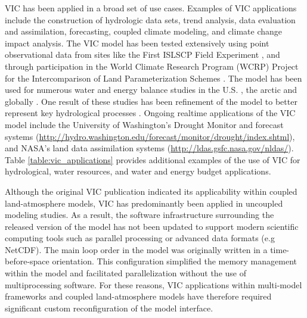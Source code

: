\documentclass[gmd, manuscript]{copernicus}
\begin{document}
  VIC has been applied in a broad set of use cases.
  Examples of VIC applications include the construction of hydrologic data sets, trend analysis, data evaluation and assimilation, forecasting, coupled climate modeling, and climate change impact analysis.
  The VIC model has been tested extensively using point observational data from sites like the First ISLSCP Field Experiment \citep[FIFE;][]{Liang_1994}, and through participation in the World Climate Research Program (WCRP) Project for the Intercomparison of Land Parameterization Schemes \citep[PILPS;][]{Bowling_2003,wood_1998}.
  The model has been used for numerous water and energy balance studies in the U.S. \citep{Abdulla_1997,Nijssen_1997}, the arctic \citep{Adam_2008,Su_2005,Tan_2011,Hamman_2016a} and globally \citep{Nijssen_2001a,Nijssen_2001b,Nijssen_2001c,Sheffield_2009}.
  One result of these studies has been refinement of the model to better represent key hydrological processes \citep{Andreadis_2009,Cherkauer_2003,Liang_1996,Liang_1999}.
  Ongoing realtime applications of the VIC model include the University of Washington’s Drought Monitor and forecast systems (\url{http://hydro.washington.edu/forecast/monitor/drought/index.shtml}), and NASA’s land data assimilation systems (\url{http://ldas.gsfc.nasa.gov/nldas/}).
  Table \ref{table:vic_applications} provides additional examples of the use of VIC for hydrological, water resources, and water and energy budget applications.

  Although the original VIC publication \citep{Liang_1994} indicated its applicability within coupled land-atmosphere models, VIC has predominantly been applied in uncoupled modeling studies.
  As a result, the software infrastructure surrounding the released version of the model has not been updated to support modern scientific computing tools such as parallel processing or advanced data formats (e.g NetCDF).
  The main loop order in the model was originally written in a time-before-space orientation.
  This configuration simplified the memory management within the model and facilitated parallelization without the use of multiprocessing software.
  For these reasons, VIC applications within multi-model frameworks \citep[e.g. NASA LIS, ][]{Kumar_2006} and coupled land-atmosphere models \citep[e.g. RASM, ][]{Hamman_2016a} have therefore required significant custom reconfiguration of the model interface.
\end{document}
